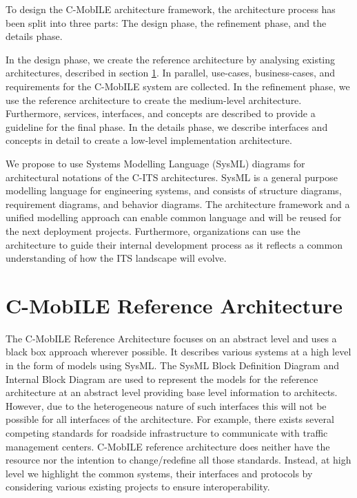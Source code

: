 \documentclass[conference]{IEEEtran}
\begin{document}
To design the C-MobILE architecture framework, the architecture process has been split into three parts:
The design phase, the refinement phase, and the details phase.

In the design phase, we create the reference architecture by analysing existing architectures, described in section \ref{secCMobILEReferenceArchitecture}.
In parallel, use-cases, business-cases, and requirements for the C-MobILE system are collected.
In the refinement phase, we use the reference architecture to create the medium-level architecture.
Furthermore, services, interfaces, and concepts are described to provide a guideline for the final phase.
In the details phase, we describe interfaces and concepts in detail to create a low-level implementation architecture.

We propose to use Systems Modelling Language (SysML) diagrams for architectural notations of the C-ITS architectures.
SysML is a general purpose modelling language for engineering systems, and consists of structure diagrams, requirement diagrams, and behavior diagrams.
The architecture framework and a unified modelling approach can enable common language and will be reused for the next deployment projects.
Furthermore, organizations can use the architecture to guide their internal development process as it reflects a common understanding of how the ITS landscape will evolve.


\section{C-MobILE Reference Architecture}
\label{secCMobILEReferenceArchitecture}

The C-MobILE Reference Architecture focuses on an abstract level and uses a black box approach wherever possible.
It describes various systems at a high level in the form of models using SysML.
The SysML Block Definition Diagram and Internal Block Diagram are used to represent the models for the reference architecture at an abstract level providing base level information to architects.
However, due to the heterogeneous nature of such interfaces this will not be possible for all interfaces of the architecture.
For example, there exists several competing standards for roadside infrastructure to communicate with traffic management centers.
C-MobILE reference architecture does neither have the resource nor the intention to change/redefine all those standards.
Instead, at high level we highlight the common systems, their interfaces and protocols by considering various existing projects to ensure interoperability.
\end{document}
